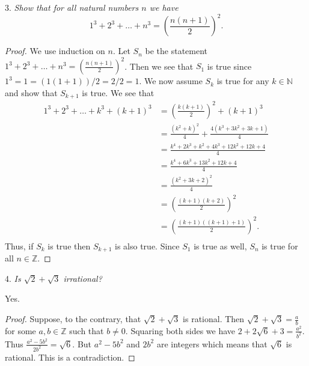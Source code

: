 \documentclass{article}
\begin{document}
\begin{flushleft}
3. \textsl{Show that for all natural numbers $n$ we have
\[
1^3+2^3+ \dots + n^3 = \left( \frac {n (n+1)} {2} \right)^2.
\]}
\begin{proof}
We use induction on $n$. Let $S_n$ be the statement $1^3+2^3+ \dots + n^3 = \left( \frac {n (n+1)} {2} \right)^2$. Then we see that $S_1$ is true since $1^3=1= (1 (1+1)) / 2 =2 / 2=1$. We now assume $S_k$ is true for any $k \in \mathbb{N}$ and show that $S_{k+1}$ is true. We see that
\begin{align*}
1^3+2^3+ \dots + k^3 + (k+1)^3 &= \left( \frac {k (k+1)} {2} \right)^2 + (k+1)^3 \\
								  &= \frac {(k^2 +k)^2} {4} + \frac {4(k^3 + 3k^2 + 3k + 1)} {4} \\
								  &= \frac {k^4 + 2k^3 + k^2 + 4k^3 + 12k^2 + 12k + 4} {4} \\
								  &= \frac {k^4 + 6k^3 + 13k^2 + 12k + 4} {4} \\
								  &= \frac {(k^2 + 3k + 2)^2} {4} \\
								  &= \left( \frac {(k+1)(k+2)} {2} \right)^2 \\
								  &= \left( \frac { (k+1) ( (k+1) + 1) } {2} \right)^2.\\
\end{align*}
Thus, if $S_k$ is true then $S_{k+1}$ is also true. Since $S_1$ is true as well, $S_n$ is true for all $n \in \mathbb{Z}$.
\end{proof}

4. \textsl{Is $\sqrt{2} + \sqrt{3}$ irrational?}\newline

Yes.

\begin{proof}
Suppose, to the contrary, that $\sqrt{2} + \sqrt{3}$ is rational. Then $\sqrt{2} + \sqrt{3} = \frac {a}{b}$ for some $a,b \in \mathbb{Z}$ such that $b \neq 0$. Squaring both sides we have $2 + 2 \sqrt{6} + 3 = \frac{a^2}{b^2}$. Thus $\frac {a^2-5b^2}{2b^2}=\sqrt{6}$. But $a^2 - 5b^2$ and $2b^2$ are integers which means that $\sqrt{6}$ is rational. This is a contradiction.
\end{proof}


\end{flushleft}
\end{document}
